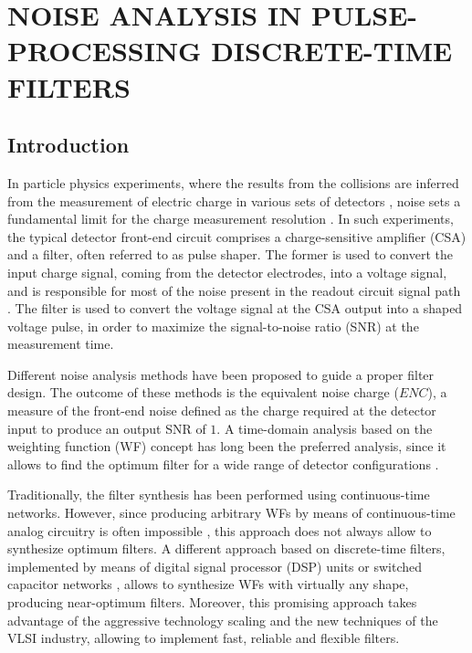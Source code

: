\chapter{NOISE ANALYSIS IN PULSE-PROCESSING DISCRETE-TIME FILTERS}
\label{chapter:theoretical}
\section{Introduction}

In particle physics experiments, where the results from the collisions are inferred from the measurement of electric charge in various sets of detectors \citep{gatti101,radeka101}, noise sets a fundamental limit for the charge measurement resolution \citep{degeronimo102}. In such experiments, the typical detector \mbox{front-end} circuit comprises a \mbox{charge-sensitive} amplifier (CSA) and a filter, often referred to as pulse shaper. The former is used to convert the input charge signal, coming from the detector electrodes, into a voltage signal, and is responsible for most of the noise present in the readout circuit signal path \citep{degeronimo101,degeronimo102}. The filter is used to convert the voltage signal at the CSA output into a shaped voltage pulse, in order to maximize the \mbox{signal-to-noise} ratio (SNR) at the measurement time.

Different noise analysis methods have been proposed to guide a proper filter design. The outcome of these methods is the equivalent noise charge ($\mathit{ENC}$), a measure of the \mbox{front-end} noise defined as the charge required at the detector input to produce an output SNR  of $1$. A \mbox{time-domain} analysis based on the weighting function (WF) concept \citep{radeka101, goulding101} has long been the preferred analysis, since it allows to find the optimum filter for a wide range of detector configurations \citep{radeka104,geraci101, gatti102,pullia103,pullia105}.

Traditionally, the filter synthesis has been performed using \mbox{continuous-time} networks. However, since producing arbitrary WFs by means of \mbox{continuous-time} analog circuitry is often impossible \citep{gatti102}, this approach does not always allow to synthesize optimum filters. A different approach based on \mbox{discrete-time} filters, implemented by means of digital signal processor (DSP) units \citep{geraci103,sampietro101,jordanov101} or switched capacitor networks \citep{porro101,fiorini101,abusleme101}, allows to synthesize WFs with virtually any shape, producing \mbox{near-optimum} filters. Moreover, this promising approach takes advantage of the aggressive technology scaling and the new techniques of the VLSI industry, allowing to implement fast, reliable and flexible filters.

